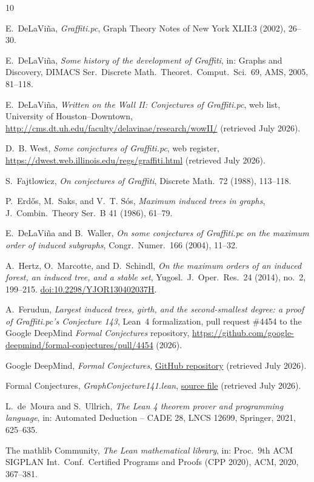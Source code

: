 \documentclass[11pt]{article}
\numberwithin{equation}{section}
\theoremstyle{remark}
\begin{document}
\begin{thebibliography}{10}

E.~DeLaVi\~na,
\emph{Graffiti.pc},
Graph Theory Notes of New York XLII:3 (2002), 26--30.

E.~DeLaVi\~na,
\emph{Some history of the development of Graffiti},
in: Graphs and Discovery, DIMACS Ser.\ Discrete Math.\ Theoret.\ Comput.\
Sci.\ 69, AMS, 2005, 81--118.

E.~DeLaVi\~na,
\emph{Written on the Wall II: Conjectures of Graffiti.pc},
web list, University of Houston--Downtown,
\url{http://cms.dt.uh.edu/faculty/delavinae/research/wowII/} (retrieved July
2026).

D.~B. West,
\emph{Some conjectures of Graffiti.pc},
web register,
\url{https://dwest.web.illinois.edu/regs/graffiti.html} (retrieved July
2026).

S.~Fajtlowicz,
\emph{On conjectures of Graffiti},
Discrete Math.\ 72 (1988), 113--118.

P.~Erd\H{o}s, M.~Saks, and V.~T. S\'os,
\emph{Maximum induced trees in graphs},
J.~Combin.\ Theory Ser.\ B 41 (1986), 61--79.

E.~DeLaVi\~na and B.~Waller,
\emph{On some conjectures of Graffiti.pc on the maximum order of induced
subgraphs},
Congr.\ Numer.\ 166 (2004), 11--32.

A.~Hertz, O.~Marcotte, and D.~Schindl,
\emph{On the maximum orders of an induced forest, an induced tree, and a
stable set},
Yugosl.\ J.\ Oper.\ Res.\ 24 (2014), no.~2, 199--215.
\href{https://doi.org/10.2298/YJOR130402037H}{doi:10.2298/YJOR130402037H}.

A.~Ferudun,
\emph{Largest induced trees, girth, and the second-smallest degree: a proof
of Graffiti.pc's Conjecture 143},
Lean~4 formalization, pull request \#4454 to the Google DeepMind
\emph{Formal Conjectures} repository,
\url{https://github.com/google-deepmind/formal-conjectures/pull/4454}
(2026).

Google DeepMind,
\emph{Formal Conjectures},
\href{https://github.com/google-deepmind/formal-conjectures}{GitHub repository}
(retrieved July 2026).

Formal Conjectures,
\emph{GraphConjecture141.lean},
\href{https://github.com/google-deepmind/formal-conjectures/blob/main/FormalConjectures/WrittenOnTheWallII/GraphConjecture141.lean}{source file}
(retrieved July 2026).

L.~de~Moura and S.~Ullrich,
\emph{The Lean 4 theorem prover and programming language},
in: Automated Deduction -- CADE 28, LNCS 12699, Springer, 2021, 625--635.

The mathlib Community,
\emph{The Lean mathematical library},
in: Proc.\ 9th ACM SIGPLAN Int.\ Conf.\ Certified Programs and Proofs
(CPP 2020), ACM, 2020, 367--381.

\end{thebibliography}
\end{document}
